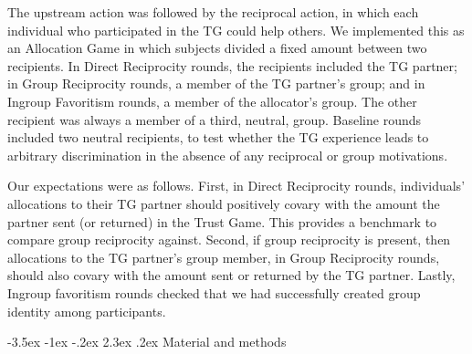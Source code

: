 \documentclass[12pt,a4paper]{article}\usepackage[]{graphicx}\usepackage[]{color}
\makeatletter
\renewcommand\section{\@startsection {section}{1}{\z@}%
{-3.5ex \@plus -1ex \@minus -.2ex}%
{2.3ex \@plus.2ex}%
{\bf\sffamily\Large}}
\makeatother
\begin{document}
The upstream action was followed by the reciprocal action, 
in which each individual who participated in the TG could help others. We implemented this as an Allocation
Game in which subjects divided a fixed amount between two recipients.
In Direct Reciprocity rounds, the recipients included the TG partner;
in Group Reciprocity rounds, a member of the TG partner's group; and
in Ingroup Favoritism rounds, a member of the allocator's group.
The other recipient was always a member of a third, neutral, group.
Baseline rounds included two neutral recipients, to test whether the
TG experience leads to arbitrary discrimination in the absence of any reciprocal
or group motivations.

Our expectations were as follows. First, in Direct Reciprocity rounds, individuals' allocations to their TG partner should positively covary with the amount the partner sent (or returned) in the Trust Game. This provides a benchmark to compare group reciprocity against.
Second, if group reciprocity is present, then allocations to the TG partner's group member, in Group Reciprocity rounds, should also covary with the amount sent or returned by the TG partner.
Lastly, Ingroup favoritism rounds checked that we had successfully created group identity among participants.


\section{Material and methods}
\label{sec:design}
\end{document}
